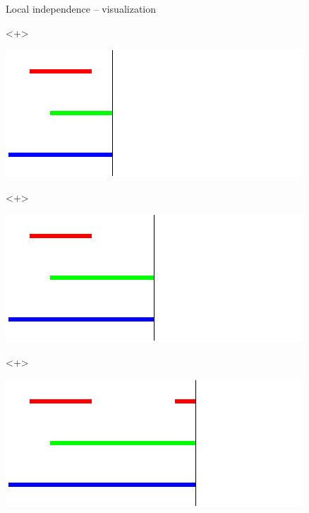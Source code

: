 \documentclass{beamer}\usepackage{listings}
\begin{document}
\begin{frame}[label={sec:org328bd26}]{Local independence -- visualization}
\begin{onlyenv}<+>
\begin{center}
\includegraphics[width=.9\linewidth]{./figs/dyn-sys1.pdf}
\end{center}
\end{onlyenv}

\begin{onlyenv}<+>
\begin{center}
\includegraphics[width=.9\linewidth]{./figs/dyn-sys2.pdf}
\end{center}
\end{onlyenv}

\begin{onlyenv}<+>
\begin{center}
\includegraphics[width=.9\linewidth]{./figs/dyn-sys3.pdf}
\end{center}
\end{onlyenv}


\end{frame}
\end{document}
